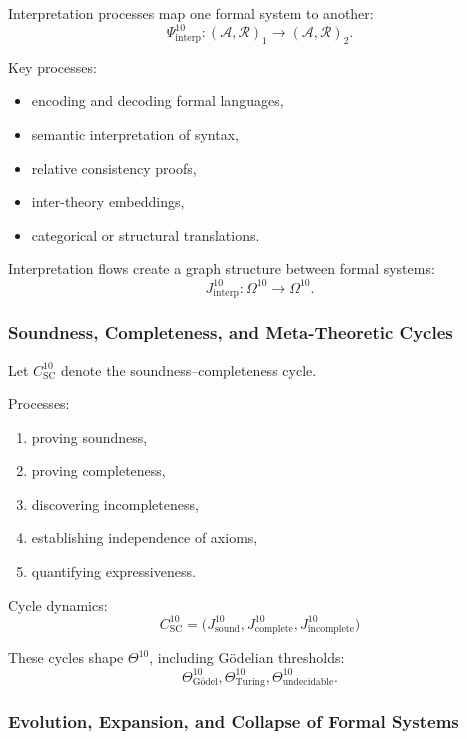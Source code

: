 Interpretation processes map one formal system to another:
\[
\Psi^{10}_{\text{interp}} : 
(\mathcal{A},\mathcal{R})_1 \to (\mathcal{A},\mathcal{R})_2.
\]

Key processes:
\begin{itemize}
    \item encoding and decoding formal languages,
    \item semantic interpretation of syntax,
    \item relative consistency proofs,
    \item inter-theory embeddings,
    \item categorical or structural translations.
\end{itemize}

Interpretation flows create a graph structure between formal systems:
\[
J^{10}_{\text{interp}} : \Omega^{10} \to \Omega^{10}.
\]

\subsubsection{Soundness, Completeness, and Meta-Theoretic Cycles}

Let $C^{10}_{\text{SC}}$ denote the soundness–completeness cycle.

Processes:
\begin{enumerate}
    \item proving soundness,
    \item proving completeness,
    \item discovering incompleteness,
    \item establishing independence of axioms,
    \item quantifying expressiveness.
\end{enumerate}

Cycle dynamics:
\[
C^{10}_{\text{SC}} = 
\big( J^{10}_{\text{sound}}, 
      J^{10}_{\text{complete}},
      J^{10}_{\text{incomplete}} \big)
\]

These cycles shape $\Theta^{10}$, including Gödelian thresholds:
\[
\Theta^{10}_{\text{Gödel}}, 
\Theta^{10}_{\text{Turing}}, 
\Theta^{10}_{\text{undecidable}}.
\]

\subsubsection{Evolution, Expansion, and Collapse of Formal Systems}


